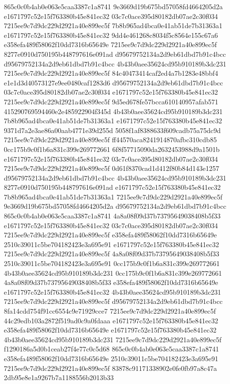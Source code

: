 865c0c0b4ab0e063e5caa3387c1a8741
9e3669d19b675bd57058fd4664205d2a
e1671797c52e15f763380b45e841ec32
03c7c0ace395d80182db07ae2c30f034
7215ee9c7d9dc229d2921a40e899ec5f
7b8b965ad4bca0e41ab51de7b31363a1
e1671797c52e15f763380b45e841ec32
9dd4e461268c8034f5c8564e155c67a6
e358efa489f58062f10dd7316b65649e
7215ee9c7d9dc229d2921a40e899ec5f
8277e0910d750195b448797616e091ad
d95679752134a2d9eb61dbd7b91c4bcc
d95679752134a2d9eb61dbd7b91c4bcc
4b43b0aee35624cd95b910189b3dc231
7215ee9c7d9dc229d2921a40e899ec5f
84c40473414caf2ed4a7b1283e48bbf4
e1e1d3d40573127e9ee0480caf1283d6
d95679752134a2d9eb61dbd7b91c4bcc
03c7c0ace395d80182db07ae2c30f034
e1671797c52e15f763380b45e841ec32
7215ee9c7d9dc229d2921a40e899ec5f
9d5ed678fe57bcca610140957afab571
415290769594460e2e485922904f345d
4b43b0aee35624cd95b910189b3dc231
7b8b965ad4bca0e41ab51de7b31363a1
e1671797c52e15f763380b45e841ec32
9371d7a2e3ae86a00aab4771e39d255d
5058f1af8388633f609cadb75a75dc9d
7215ee9c7d9dc229d2921a40e899ec5f
ff44570aca8241914870afbc310cdb85
0cc175b9c0f1b6a831c399e269772661
6f8f57715090da2632453988d9a1501b
e1671797c52e15f763380b45e841ec32
03c7c0ace395d80182db07ae2c30f034
7215ee9c7d9dc229d2921a40e899ec5f
0d61f8370cad1d412f80b84d143e1257
d95679752134a2d9eb61dbd7b91c4bcc
4b43b0aee35624cd95b910189b3dc231
8277e0910d750195b448797616e091ad
e1671797c52e15f763380b45e841ec32
7b8b965ad4bca0e41ab51de7b31363a1
7215ee9c7d9dc229d2921a40e899ec5f
9e3669d19b675bd57058fd4664205d2a
d95679752134a2d9eb61dbd7b91c4bcc
865c0c0b4ab0e063e5caa3387c1a8741
4a8a08f09d37b73795649038408b5f33
e1671797c52e15f763380b45e841ec32
03c7c0ace395d80182db07ae2c30f034
7215ee9c7d9dc229d2921a40e899ec5f
e358efa489f58062f10dd7316b65649e
2510c39011c5be704182423e3a695e91
e1671797c52e15f763380b45e841ec32
7215ee9c7d9dc229d2921a40e899ec5f
4a8a08f09d37b73795649038408b5f33
2510c39011c5be704182423e3a695e91
0cc175b9c0f1b6a831c399e269772661
4b43b0aee35624cd95b910189b3dc231
0cc175b9c0f1b6a831c399e269772661
4a8a08f09d37b73795649038408b5f33
e358efa489f58062f10dd7316b65649e
e1671797c52e15f763380b45e841ec32
4b43b0aee35624cd95b910189b3dc231
7215ee9c7d9dc229d2921a40e899ec5f
d95679752134a2d9eb61dbd7b91c4bcc
8fa14cdd754f91cc6554c9e71929cce7
7215ee9c7d9dc229d2921a40e899ec5f
44c29edb103a2872f519ad0c9a0fdaaa
e1671797c52e15f763380b45e841ec32
e358efa489f58062f10dd7316b65649e
e1671797c52e15f763380b45e841ec32
4b43b0aee35624cd95b910189b3dc231
7215ee9c7d9dc229d2921a40e899ec5f
f1290186a5d0b1ceab27f4e77c0c5d68
865c0c0b4ab0e063e5caa3387c1a8741
e358efa489f58062f10dd7316b65649e
2510c39011c5be704182423e3a695e91
7215ee9c7d9dc229d2921a40e899ec5f
83878c91171338902e0fe0fb97a8c47a
2db95e8e1a9267b7a1188556b2013b33
